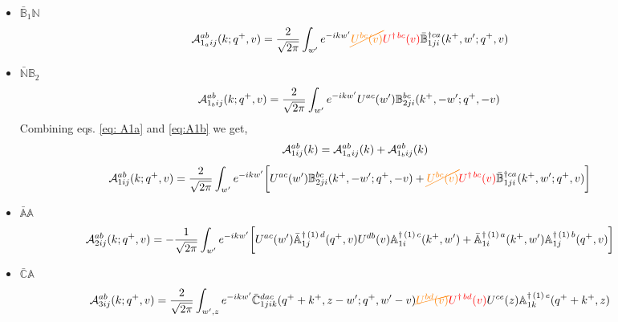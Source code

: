\documentclass[aps,prd,amsmath,amssymb,nofootinbib]{revtex4-2}
\def\mf#1{\mathbb{#1}}
\numberwithin{equation}{section}
\begin{document}
\begin{itemize}
\item $\bar{\mf{B}}_{1} \mf{N}$
\begin{align}\label{eq: A1a}
    {\cal A}^{ab}_{1_{a}ij}(k; q^{+},v) & = \frac{2}{\sqrt{2\pi}}\int_{w^{\prime}}e^{-i k w^\prime} {\color{orange}\cancel{U^{ bc}(v)}}{\color{red}U^{\dagger\, bc}(v)}\Bar{\mf{B}}^{\dagger ca}_{1ji}(k^{+},w^{\prime};q^{+},v)
\end{align}
 \item $\bar{{\mf{N}}}\mf{B}_{2}$
\begin{align} \label{eq:A1b}
        {\cal A}^{ab}_{1_{b}ij}(k; q^{+},v) & = \frac{2}{\sqrt{2\pi}}  \int_{w^{\prime}}e^{-i k w^\prime}U^{ac}(w^{\prime}) \mf{B}^{bc}_{2ji}(k^{+},-w^{\prime};q^{+},-v)
    \end{align}
Combining eqs. \eqref{eq: A1a} and \eqref{eq:A1b} we get,
$${\cal A}^{ab}_{1ij}(k) = {\cal A}^{ab}_{1_{a}ij}(k) + {\cal A}^{ab}_{1_{b}ij}(k)$$
\begin{align}
     {\cal A}^{ab}_{1ij}(k; q^{+},v) & = \frac{2}{\sqrt{2\pi}} \int_{w^{\prime}}e^{-i k w^\prime}\bigg[U^{ac}(w^{\prime}) \mf{B}^{bc}_{2ji}(k^{+},-w^{\prime};q^{+},-v)+{\color{orange}\cancel{U^{ bc}(v)}}{\color{red}U^{\dagger\, bc}(v)}\Bar{\mf{B}}^{\dagger ca}_{1ji}(k^{+},w^{\prime};q^{+},v)\bigg]
\end{align}
   \item $\bar{{\mf{A}}} \mf{A}$
\begin{align} 
     {\cal A}^{ab}_{2ij}(k; q^{+},v) & = -\frac{1}{\sqrt{2\pi}} \int_{w^{\prime}} e^{-ikw^{\prime}}\bigg[U^{ac}(w^{\prime}) \Bar{\mf{A}}^{\dagger\,(1)\, d}_{1j}(q^{+},v)U^{ db}(v) \mf{A}^{\dagger\,(1)\, c}_{1i}(k^{+},w^{\prime})+\Bar{\mf{A}}^{\dagger\,(1)\, a}_{1i}(k^{+},w^{\prime}) \mf{A}^{\dagger\,(1)\, b}_{1j}(q^{+},v)\bigg] 
\end{align}
\item $\bar{{\mf{C}}} \mf{A}$
    \begin{align}
         {\cal A}^{ab}_{3ij}(k; q^{+},v) & = \frac{2}{\sqrt{2\pi}}  \int_{w^{\prime},z} e^{-i k w^\prime}\Bar{\mf{C}}^{dac}_{1jik}(q^{+}+k^{+},z-w^{\prime}; q^{+},w^{\prime}-v){\color{orange}\cancel{U^{bd}(v)}}{\color{red}U^{\dagger\, bd}(v)}U^{ce}(z) \mf{A}^{\dagger\,(1)\,e}_{1k}(q^{+}+k^{+},z)
    \end{align}
\end{itemize}
\end{document}
